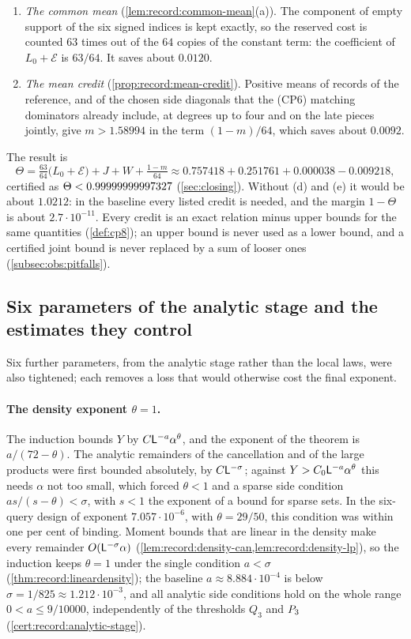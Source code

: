 \begin{enumerate}[label=(\alph*)]
 October~18 design this step alone took the closing from $1.1219$ to
 $1.0122$.
\item \emph{The common mean} (\cref{lem:record:common-mean}(a)). The component
 of empty support of the six signed indices is kept exactly, so the reserved
 cost is counted $63$ times out of the $64$ copies of the constant term: the
 coefficient of $L_0+\mathcal E$ is $63/64$. It saves about $0.0120$.
\item \emph{The mean credit} (\cref{prop:record:mean-credit}). Positive means of
 records of the reference, and of the chosen side diagonals that
 the (CP6) matching dominators already include, at degrees up to
 four and on the late pieces jointly, give
 $m>1.58994$ in the term $(1-m)/64$, which saves about $0.0092$.
\end{enumerate}
The result is
\[
 \Theta=\tfrac{63}{64}\bigl(L_0+\mathcal E\bigr)+J+W+\tfrac{1-m}{64}
 \approx0.757418+0.251761+0.000038-0.009218,
\]
certified as $\Theta<0.99999999997327$ (\cref{sec:closing}). Without (d) and (e)
it would be about $1.0212$: in the baseline every listed credit is needed, and
the margin $1-\Theta$ is about $2.7\cdot10^{-11}$. Every credit is an exact
relation minus upper bounds for the same quantities (\cref{def:cp8}); an upper
bound is never used as a lower bound, and a certified joint bound is never
replaced by a sum of looser ones (\cref{subsec:obs:pitfalls}).

\subsection{Six parameters of the analytic stage and the estimates they control}\label{subsec:walk:analytic}

Six further parameters, from the analytic stage rather than the
local laws, were also tightened; each removes a loss that would
otherwise cost the final exponent.

\paragraph{The density exponent $\theta=1$.}
The induction bounds $Y$ by $C\mathsf L^{-a}\alpha^\theta$, and the exponent of the
theorem is $a/(72-\theta)$. The analytic remainders of the cancellation and of
the large products were first bounded absolutely, by $C\mathsf L^{-\sigma}$; against
$Y>C_0\mathsf L^{-a}\alpha^\theta$ this needs $\alpha$ not too small, which forced
$\theta<1$ and a sparse side condition $as/(s-\theta)<\sigma$,
with $s<1$ the exponent of a bound for sparse sets. In the
six-query design of exponent $7.057\cdot10^{-6}$, with
$\theta=29/50$, this condition was within one per cent of
binding. Moment bounds that are linear in the density make every remainder
$O(\mathsf L^{-\sigma}\alpha)$ (\cref{lem:record:density-can,lem:record:density-lp}),
so the induction keeps $\theta=1$ under the single condition
$a<\sigma$ (\cref{thm:record:lineardensity}); the baseline
$a\approx8.884\cdot10^{-4}$ is below
$\sigma=1/825\approx1.212\cdot10^{-3}$, and all analytic side
conditions hold on the whole
range $0<a\le9/10000$, independently of the thresholds $Q_3$ and $P_3$
(\cref{cert:record:analytic-stage}).

